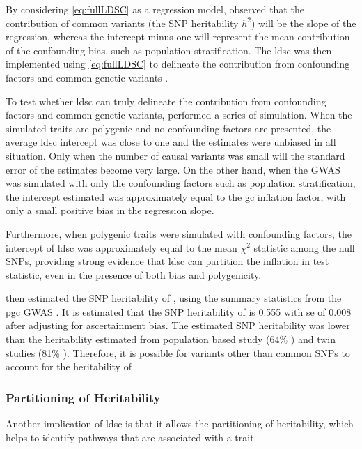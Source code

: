 	By considering \cref{eq:fullLDSC} as a regression model, \citet{Bulik-Sullivan2015} observed that the contribution of common variants (the \gls{SNP} heritability $h^2$) will be the slope of the regression, whereas the intercept minus one will represent the mean contribution of the confounding bias, such as population stratification. 
	The \gls{ldsc} was then implemented using \cref{eq:fullLDSC} to delineate the contribution from confounding factors and common genetic variants \citet{Bulik-Sullivan2015}.
	
	To test whether \gls{ldsc} can truly delineate the contribution from confounding factors and common genetic variants, \citet{Bulik-Sullivan2015} performed a series of simulation.
	When the simulated traits are polygenic and no confounding factors are presented, the average \gls{ldsc} intercept was close to one and the estimates were unbiased in all situation.
	Only when the number of causal variants was small will the standard error of the estimates become very large.
	On the other hand, when the \gls{GWAS} was simulated with only the confounding factors such as population stratification, the intercept estimated was approximately equal to the \gls{gc} inflation factor, with only a small positive bias in the regression slope.
	
	Furthermore, when polygenic traits were simulated with confounding factors, the intercept of \gls{ldsc} was approximately equal to the mean $\chi^2$ statistic among the null \glspl{SNP}, providing strong evidence that \gls{ldsc} can partition the inflation in test statistic, even in the presence of both bias and polygenicity.
	
	\citet{Bulik-Sullivan2015} then estimated the \gls{SNP} heritability of , using the summary statistics from the \gls{pgc}  \gls{GWAS} \citep{Ripke2014}.
	It is estimated that the \gls{SNP} heritability of  is 0.555 with \gls{se} of 0.008 after adjusting for ascertainment bias.
	The estimated \gls{SNP} heritability was lower than the heritability estimated from population based study (64\% \citep{Lichtenstein2009}) and twin studies (81\% \citep{Sullivan2003}).
	Therefore, it is possible for variants other than common \glspl{SNP} to account for the heritability of .
	
	\subsubsection{Partitioning of Heritability}
	Another implication of \gls{ldsc} is that it allows the partitioning of heritability, which helps to identify pathways that are associated with a trait.
	
